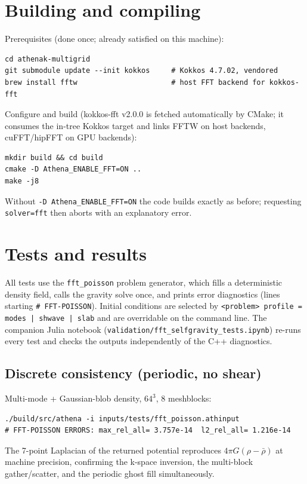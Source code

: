 \documentclass[11pt]{article}
\newcommand{\code}[1]{\texttt{#1}}
\begin{document}
\section{Building and compiling}

Prerequisites (done once; already satisfied on this machine):
\begin{lstlisting}
cd athenak-multigrid
git submodule update --init kokkos     # Kokkos 4.7.02, vendored
brew install fftw                      # host FFT backend for kokkos-fft
\end{lstlisting}
Configure and build (kokkos-fft v2.0.0 is fetched automatically by CMake;
it consumes the in-tree Kokkos target and links FFTW on host backends,
cuFFT/hipFFT on GPU backends):
\begin{lstlisting}
mkdir build && cd build
cmake -D Athena_ENABLE_FFT=ON ..
make -j8
\end{lstlisting}
Without \code{-D Athena\_ENABLE\_FFT=ON} the code builds exactly as before;
requesting \code{solver=fft} then aborts with an explanatory error.

\section{Tests and results}
\label{sec:tests}

All tests use the \code{fft\_poisson} problem generator, which fills a
deterministic density field, calls the gravity solve once, and prints error
diagnostics (lines starting \code{\# FFT-POISSON}). Initial conditions are
selected by \code{<problem> profile = modes | shwave | slab} and are overridable
on the command line. The companion Julia notebook
(\code{validation/fft\_selfgravity\_tests.ipynb}) re-runs every test and checks
the outputs independently of the C++ diagnostics.

\subsection{Discrete consistency (periodic, no shear)}
Multi-mode + Gaussian-blob density, $64^3$, 8 meshblocks:
\begin{lstlisting}
./build/src/athena -i inputs/tests/fft_poisson.athinput
# FFT-POISSON ERRORS: max_rel_all= 3.757e-14  l2_rel_all= 1.216e-14
\end{lstlisting}
The 7-point Laplacian of the returned potential reproduces
$4\pi G(\rho-\bar\rho)$ at machine precision, confirming the k-space inversion,
the multi-block gather/scatter, and the periodic ghost fill simultaneously.
\end{document}
